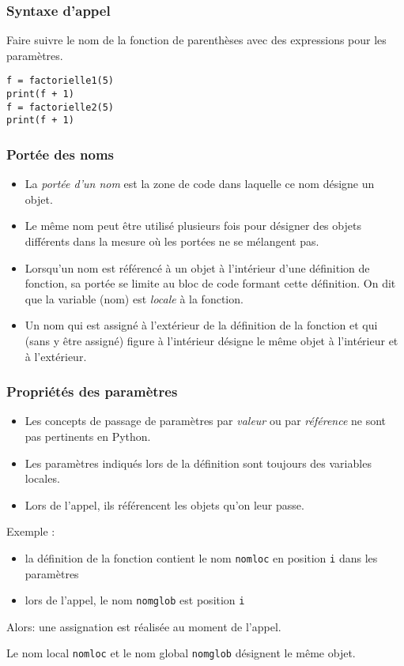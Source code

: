 \begin{frame}[fragile]
  \frametitle{Syntaxe d'appel}
Faire suivre le nom de la fonction de parenthèses avec des expressions pour les paramètres.
\begin{verbatim}
f = factorielle1(5)
print(f + 1)
f = factorielle2(5)
print(f + 1)
\end{verbatim}
\end{frame}

\begin{frame}
  \frametitle{Portée des noms}
\begin{itemize}
  \item La \emph{portée d'un nom} est la zone de code dans laquelle ce nom désigne un objet.
  \item Le même nom peut être utilisé plusieurs fois pour désigner des objets différents dans la mesure où les portées ne se mélangent pas.
  \item Lorsqu'un nom est référencé à un objet à l'intérieur d'une définition de fonction, sa portée se limite au bloc de code formant cette définition. On dit que la variable (nom) est \emph{locale} à la fonction.
  \item Un nom qui est assigné à l'extérieur de la définition de la fonction et qui (sans y être assigné) figure à l'intérieur désigne le même objet à l'intérieur et à l'extérieur.
\end{itemize}
\end{frame}

\begin{frame}
  \frametitle{Propriétés des paramètres}
\begin{itemize}
  \item Les concepts de passage de paramètres par \emph{valeur} ou par \emph{référence} ne sont pas pertinents en Python.
  \item Les paramètres indiqués lors de la définition sont toujours des variables locales.
  \item Lors de l'appel, ils référencent les objets qu'on leur passe.
\end{itemize}
Exemple :
\begin{itemize}
  \item la définition de la fonction contient le nom \texttt{nomloc} en position \texttt{i} dans les paramètres
  \item lors de l'appel, le nom \texttt{nomglob} est position \texttt{i}
\end{itemize}
Alors: une assignation est réalisée au moment de l'appel.

Le nom local \texttt{nomloc} et le nom global \texttt{nomglob} désignent le même objet.\newline
\end{frame}

